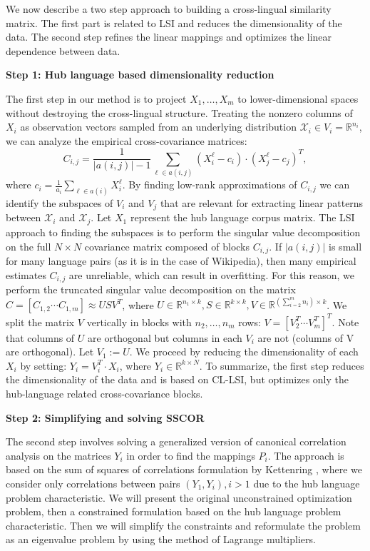 \documentclass[twoside,11pt]{article}
\newcommand{\RR}{\mathbb{R}}
\begin{document}
We now describe a two step approach to building a cross-lingual similarity matrix. The first part is related to LSI and reduces the dimensionality of the data. The second step refines the linear mappings and optimizes the linear dependence between data.

\textbf{Step 1: Hub language based dimensionality reduction}

The first step in our method is to project $X_1, \ldots, X_m$ to lower-dimensional spaces without destroying the cross-lingual structure. Treating the nonzero columns of $X_i$ as observation vectors sampled from an underlying distribution $\mathcal{X}_i \in V_i = \RR^{n_i}$, we can analyze the empirical cross-covariance matrices:
$$C_{i,j} = \frac{1}{|a(i,j)|-1 }\sum_{\ell \in a(i,j)} (X_i^{\ell} - c_i)\cdot (X_j^{\ell} - c_j)^T,$$
 where $c_i = \frac{1}{a_i} \sum_{\ell \in a(i)}X_i^{\ell}$. By finding low-rank approximations of $C_{i,j}$ we can identify the subspaces of $V_i$ and $V_j$ that are relevant for extracting linear patterns between $\mathcal{X}_i$ and $\mathcal{X}_j$. Let $X_1$ represent the hub language corpus matrix. The LSI approach to finding the subspaces is to perform the singular value decomposition on the full $N \times N$ covariance matrix composed of blocks $C_{i,j}$. If $|a(i,j)|$ is small for many language pairs (as it is in the case of Wikipedia), then many empirical estimates $C_{i,j}$ are unreliable, which can result in overfitting. For this reason, we perform the truncated singular value decomposition on the matrix $C = [C_{1,2}  \cdots  C_{1,m}] \approx U S V^T$, where $U \in \RR^{n_1 \times k}, S \in \RR^{k \times k}, V \in \RR^{(\sum_{i=2}^m n_i) \times k}$. We split the matrix $V$ vertically in blocks with $n_2, \ldots, n_m$ rows: $V = [V_2^T  \cdots  V_m^T]^T$. Note that columns of $U$ are orthogonal but columns in each $V_i$ are not (columns of V are orthogonal). Let $V_1 := U$. We proceed by reducing the dimensionality of each $X_i$ by setting: $Y_i = V_i^T \cdot X_i$, where $Y_i \in \RR^{k\times N}$. To summarize, the first step reduces the dimensionality of the data and is based on CL-LSI, but optimizes only the hub-language related cross-covariance blocks.

\textbf{Step 2: Simplifying and solving SSCOR}

The second step involves solving a generalized version of canonical correlation analysis on the matrices $Y_i$ in order to find the mappings $P_i$. The approach is based on the sum of squares of correlations formulation by Kettenring \cite{Kettenring}, where we consider only correlations between pairs $(Y_1, Y_i), i >1$ due to the hub language problem characteristic.
We will present the original unconstrained optimization problem, then a constrained formulation based on the hub language problem characteristic. Then we will simplify the constraints and reformulate
the problem as an eigenvalue problem by using the method of Lagrange multipliers.
\end{document}
